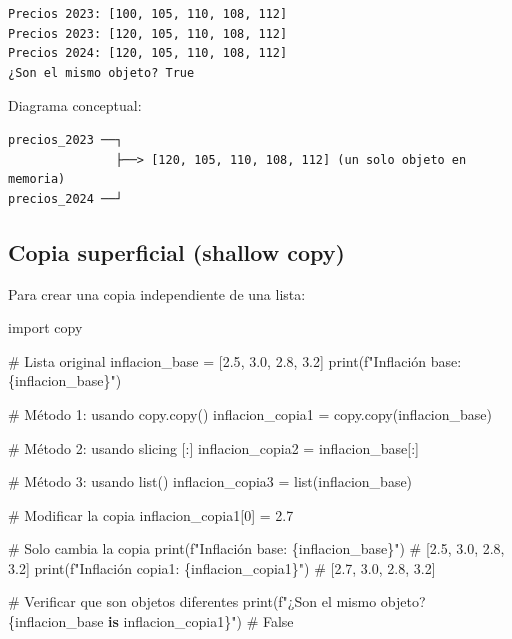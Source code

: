 \documentclass[
  doc,
  floatsintext,
  longtable,
  a4paper,
  nolmodern,
  notxfonts,
  notimes,
  12pt,
  colorlinks=true,linkcolor=blue,citecolor=blue,urlcolor=blue]{apa7}
\newenvironment{Shaded}{\begin{snugshade}}{\end{snugshade}}
\newcommand{\BuiltInTok}[1]{\textcolor[rgb]{0.00,0.23,0.31}{#1}}
\newcommand{\CommentTok}[1]{\textcolor[rgb]{0.37,0.37,0.37}{#1}}
\newcommand{\DecValTok}[1]{\textcolor[rgb]{0.68,0.00,0.00}{#1}}
\newcommand{\FloatTok}[1]{\textcolor[rgb]{0.68,0.00,0.00}{#1}}
\newcommand{\ImportTok}[1]{\textcolor[rgb]{0.00,0.46,0.62}{#1}}
\newcommand{\KeywordTok}[1]{\textcolor[rgb]{0.00,0.23,0.31}{\textbf{#1}}}
\newcommand{\NormalTok}[1]{\textcolor[rgb]{0.00,0.23,0.31}{#1}}
\newcommand{\OperatorTok}[1]{\textcolor[rgb]{0.37,0.37,0.37}{#1}}
\newcommand{\SpecialCharTok}[1]{\textcolor[rgb]{0.37,0.37,0.37}{#1}}
\newcommand{\SpecialStringTok}[1]{\textcolor[rgb]{0.13,0.47,0.30}{#1}}
\begin{document}
\begin{verbatim}
Precios 2023: [100, 105, 110, 108, 112]
Precios 2023: [120, 105, 110, 108, 112]
Precios 2024: [120, 105, 110, 108, 112]
¿Son el mismo objeto? True
\end{verbatim}

Diagrama conceptual:

\begin{verbatim}
precios_2023 ──┐
               ├──> [120, 105, 110, 108, 112] (un solo objeto en memoria)
precios_2024 ──┘
\end{verbatim}

\subsection{Copia superficial (shallow
copy)}\label{copia-superficial-shallow-copy}

Para crear una copia independiente de una lista:

\begin{Shaded}
\begin{Highlighting}[]
\ImportTok{import}\NormalTok{ copy}

\CommentTok{\# Lista original}
\NormalTok{inflacion\_base }\OperatorTok{=}\NormalTok{ [}\FloatTok{2.5}\NormalTok{, }\FloatTok{3.0}\NormalTok{, }\FloatTok{2.8}\NormalTok{, }\FloatTok{3.2}\NormalTok{]}
\BuiltInTok{print}\NormalTok{(}\SpecialStringTok{f"Inflación base: }\SpecialCharTok{\{}\NormalTok{inflacion\_base}\SpecialCharTok{\}}\SpecialStringTok{"}\NormalTok{)}

\CommentTok{\# Método 1: usando copy.copy()}
\NormalTok{inflacion\_copia1 }\OperatorTok{=}\NormalTok{ copy.copy(inflacion\_base)}

\CommentTok{\# Método 2: usando slicing [:]}
\NormalTok{inflacion\_copia2 }\OperatorTok{=}\NormalTok{ inflacion\_base[:]}

\CommentTok{\# Método 3: usando list()}
\NormalTok{inflacion\_copia3 }\OperatorTok{=} \BuiltInTok{list}\NormalTok{(inflacion\_base)}

\CommentTok{\# Modificar la copia}
\NormalTok{inflacion\_copia1[}\DecValTok{0}\NormalTok{] }\OperatorTok{=} \FloatTok{2.7}

\CommentTok{\# Solo cambia la copia}
\BuiltInTok{print}\NormalTok{(}\SpecialStringTok{f"Inflación base:   }\SpecialCharTok{\{}\NormalTok{inflacion\_base}\SpecialCharTok{\}}\SpecialStringTok{"}\NormalTok{)   }\CommentTok{\# [2.5, 3.0, 2.8, 3.2]}
\BuiltInTok{print}\NormalTok{(}\SpecialStringTok{f"Inflación copia1: }\SpecialCharTok{\{}\NormalTok{inflacion\_copia1}\SpecialCharTok{\}}\SpecialStringTok{"}\NormalTok{) }\CommentTok{\# [2.7, 3.0, 2.8, 3.2]}

\CommentTok{\# Verificar que son objetos diferentes}
\BuiltInTok{print}\NormalTok{(}\SpecialStringTok{f"¿Son el mismo objeto? }\SpecialCharTok{\{}\NormalTok{inflacion\_base }\KeywordTok{is}\NormalTok{ inflacion\_copia1}\SpecialCharTok{\}}\SpecialStringTok{"}\NormalTok{)  }\CommentTok{\# False}
\end{Highlighting}
\end{Shaded}
\end{document}
